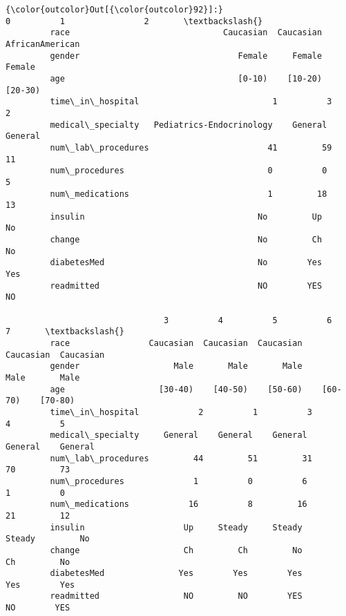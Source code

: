 \documentclass[11pt]{article}
\begin{document}
\begin{Verbatim}[commandchars=\\\{\}]
{\color{outcolor}Out[{\color{outcolor}92}]:}                                       0          1                2       \textbackslash{}
         race                               Caucasian  Caucasian  AfricanAmerican   
         gender                                Female     Female           Female   
         age                                   [0-10)    [10-20)          [20-30)   
         time\_in\_hospital                           1          3                2   
         medical\_specialty   Pediatrics-Endocrinology    General          General   
         num\_lab\_procedures                        41         59               11   
         num\_procedures                             0          0                5   
         num\_medications                            1         18               13   
         insulin                                   No         Up               No   
         change                                    No         Ch               No   
         diabetesMed                               No        Yes              Yes   
         readmitted                                NO        YES               NO   
         
                                3          4          5          6          7       \textbackslash{}
         race                Caucasian  Caucasian  Caucasian  Caucasian  Caucasian   
         gender                   Male       Male       Male       Male       Male   
         age                   [30-40)    [40-50)    [50-60)    [60-70)    [70-80)   
         time\_in\_hospital            2          1          3          4          5   
         medical\_specialty     General    General    General    General    General   
         num\_lab\_procedures         44         51         31         70         73   
         num\_procedures              1          0          6          1          0   
         num\_medications            16          8         16         21         12   
         insulin                    Up     Steady     Steady     Steady         No   
         change                     Ch         Ch         No         Ch         No   
         diabetesMed               Yes        Yes        Yes        Yes        Yes   
         readmitted                 NO         NO        YES         NO        YES   
         

\end{Verbatim}
\end{document}
